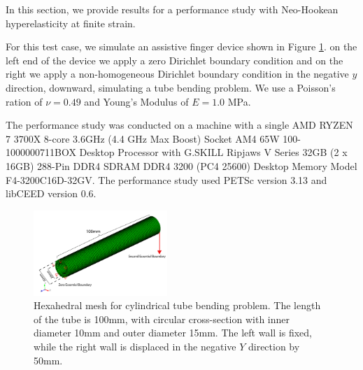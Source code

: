 In this section, we provide results for a performance study with Neo-Hookean hyperelasticity at finite strain.

For this test case, we simulate an assistive finger device shown in Figure \ref{fig:hyper-cylinder}.
on the left end of the device we apply a zero Dirichlet boundary condition and on the right we apply a non-homogeneous Dirichlet boundary condition in the negative $y$ direction, downward, simulating a tube bending problem.
We use a Poisson's ration of $\nu = 0.49$ and Young's Modulus of $E = 1.0$ MPa.

The performance study was conducted on a machine with a single AMD RYZEN 7 3700X 8-core 3.6GHz (4.4 GHz Max Boost) Socket AM4 65W 100-1000000711BOX Desktop Processor with G.SKILL Ripjaws V Series 32GB (2 x 16GB) 288-Pin DDR4 SDRAM DDR4 3200 (PC4 25600) Desktop Memory Model F4-3200C16D-32GV.
The performance study used PETSc version 3.13 and libCEED version 0.6.

\begin{figure}
 \begin{center}
      \includegraphics[width=0.45\textwidth]{../img/cylinder.pdf}
\end{center}
\caption{Hexahedral mesh for cylindrical tube bending problem. The length of the tube is 100mm, with circular cross-section with inner diameter 10mm and outer diameter 15mm.  The left wall is fixed, while the right wall is displaced in the negative $Y$ direction by 50mm.}
    \label{fig:hyper-cylinder}
\end{figure}

